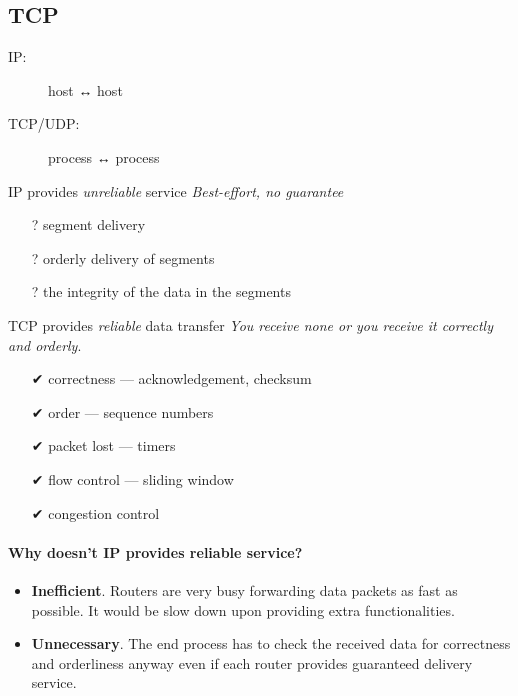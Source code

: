 \subsection{TCP}

\begin{frame}
  \begin{description}
  \item[IP:] host {\Large {\dejavu ↔}} host
  \item[TCP/UDP:] process {\Large {\dejavu ↔}} process
  \end{description}

  \begin{iblock}{IP provides \emph{unreliable} service}
    \emph{Best-effort, no guarantee}
    \begin{itemize}
    \item[?] segment delivery
    \item[?] orderly delivery of segments
    \item[?] the integrity of the data in the segments
    \end{itemize}
  \end{iblock}
  \begin{iblock}{TCP provides \emph{reliable} data transfer}
    \emph{You receive none or you receive it correctly and orderly}.
    \begin{itemize}
    \item[{\dejavu ✔}] correctness --- acknowledgement, checksum
    \item[{\dejavu ✔}] order --- sequence numbers
    \item[{\dejavu ✔}] packet lost --- timers
    \item[{\dejavu ✔}] flow control --- sliding window
    \item[{\dejavu ✔}] congestion control 
    \end{itemize}
  \end{iblock}
\end{frame}

\paragraph{Why doesn't IP provides reliable service?}

\begin{itemize}
\item \textbf{Inefficient}. Routers are very busy forwarding data packets as fast as
  possible. It would be slow down upon providing extra functionalities.
\item \textbf{Unnecessary}. The end process has to check the received data for correctness
  and orderliness anyway even if each router provides guaranteed delivery service.
\end{itemize}

